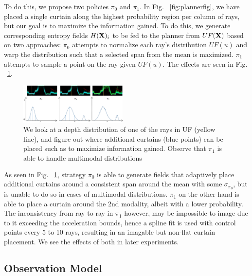 To do this, we propose two policies $\pi_{0}$ and $\pi_{1}$. In Fig. ~\ref{fig:plannerfig}, we have placed a single curtain along the highest probability region per column of rays, but our goal is to maximize the information gained. To do this, we generate corresponding entropy fields $H(\mathbf{X})_{i}$ to be fed to the planner from $UF(\mathbf{X})$ based on two approaches: $\pi_{0}$ attempts to normalize each ray's distribution $UF(u)$ and warp the distribution such that a selected span from the mean is maximized. $\pi_{1}$ attempts to sample a point on the ray given $UF(u)$. The effects are seen in Fig. ~\ref{fig:m0m1}.

\begin{figure}[h]
   \centering
       \centering
       \includegraphics[width=0.48\textwidth]{figures/fields.pdf}
   \centering
   \caption{We look at a depth distribution of one of the rays in UF (yellow line), and figure out where additional curtains (blue points) can be placed such as to maximize information gained. Observe that $\pi_{1}$ is able to handle multimodal distributions}
   \label{fig:m0m1} 
\end{figure}

As seen in Fig. ~\ref{fig:m0m1}, strategy $\pi_{0}$ is able to generate fields that adaptively place additional curtains around a consistent span around the mean with some $\sigma_{\pi_{0}}$, but is unable to do so in cases of multimodal distributions. $\pi_{1}$ on the other hand is able to place a curtain around the 2nd modality, albeit with a lower probability. The inconsistency from ray to ray in $\pi_{1}$ however, may be impossible to image due to it exceeding the acceleration bounds, hence a spline fit is used with control points every 5 to 10 rays, resulting in an imagable but non-flat curtain placement. We see the effects of both in later experiments.

\subsection{Observation Model}

